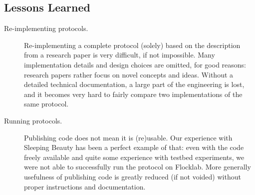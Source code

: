 \subsection{Lessons Learned}
\label{sec:lessonsLearned}


\begin{description}

	\item[Re-implementing protocols.] Re-implementing a complete protocol (solely) based on the description from a research paper is very difficult, if not impossible. Many implementation details and design choices are omitted, for good reasons: research papers rather focus on novel concepts and ideas.
	Without a detailed technical documentation, a large part of the engineering is lost, and it becomes very hard to fairly compare two implementations of the same protocol.

	\item[Running protocols.] Publishing code does not mean it is (re)usable. Our experience with Sleeping Beauty has been a perfect example of that: even with the code freely available and quite some experience with testbed experiments, we were not able to successfully run the protocol on Flocklab.
	More generally usefulness of publishing code is greatly reduced (if not voided) without proper instructions and documentation.

\end{description}

